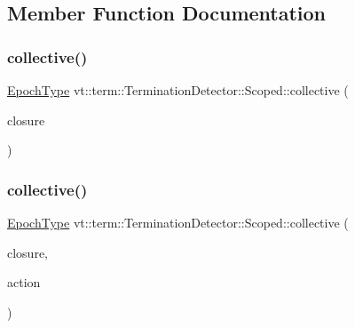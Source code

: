 \subsection{Member Function Documentation}
\mbox{\label{structvt_1_1term_1_1_termination_detector_1_1_scoped_a7debccd958f4257512a8640ab1ffb324}} 
\subsubsection{\texorpdfstring{collective()}{collective()}\hspace{0.1cm}{\footnotesize\ttfamily [1/2]}}
{\footnotesize\ttfamily \hyperlink{namespacevt_a985a5adf291c34a3ca263b3378388236}{Epoch\+Type} vt\+::term\+::\+Termination\+Detector\+::\+Scoped\+::collective (\begin{DoxyParamCaption}\item[{\hyperlink{namespacevt_ae0a5a7b18cc99d7b732cb4d44f46b0f3}{Action\+Type}}]{closure }\end{DoxyParamCaption})\hspace{0.3cm}{\ttfamily [static]}}

\mbox{\label{structvt_1_1term_1_1_termination_detector_1_1_scoped_a199da03a9c1a2fbce14c15484e71bacc}} 
\subsubsection{\texorpdfstring{collective()}{collective()}\hspace{0.1cm}{\footnotesize\ttfamily [2/2]}}
{\footnotesize\ttfamily \hyperlink{namespacevt_a985a5adf291c34a3ca263b3378388236}{Epoch\+Type} vt\+::term\+::\+Termination\+Detector\+::\+Scoped\+::collective (\begin{DoxyParamCaption}\item[{\hyperlink{namespacevt_ae0a5a7b18cc99d7b732cb4d44f46b0f3}{Action\+Type}}]{closure,  }\item[{\hyperlink{namespacevt_ae0a5a7b18cc99d7b732cb4d44f46b0f3}{Action\+Type}}]{action }\end{DoxyParamCaption})\hspace{0.3cm}{\ttfamily [static]}}

